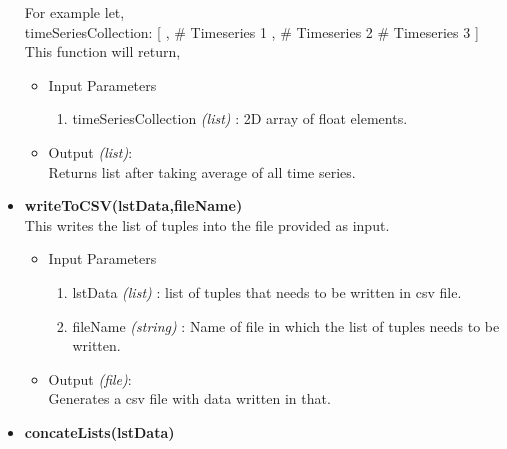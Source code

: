 \begin{itemize}
	For example let,\\
	timeSeriesCollection: [ \newline
	    [1,2,3], \# Timeseries 1 \newline
	    [4,5,6], \# Timeseries 2 \newline
	    [7,8,9] \# Timeseries 3 \newline
	] \newline
	\\
	This function will return,\newline
	[4,5,6] \newline
	
	\begin{itemize}
	  \item Input Parameters
	  
	  \begin{enumerate}
	    \item timeSeriesCollection \textit{(list)} : 2D array of float 
elements.
	  \end{enumerate}

	  \item Output \textit{(list)}: \\
	  Returns list after taking average of all time series.
	  
	\end{itemize}
 
 
 
 \item \textbf{writeToCSV(lstData,fileName)} \\
 
 This writes the list of tuples into the file provided as input.
 \begin{itemize}
	  \item Input Parameters
	  
	  \begin{enumerate}
	    \item lstData \textit{(list)} : list of tuples that needs to be written in csv file.
	    \item fileName \textit{(string)} : Name of file in which the list of tuples needs to be written.
	    \end{enumerate}

	  \item Output \textit{(file)}: \\
	  Generates a csv file with data written in that.
	  
	\end{itemize}

 \item \textbf{concateLists(lstData)} \\
 

\end{itemize}
